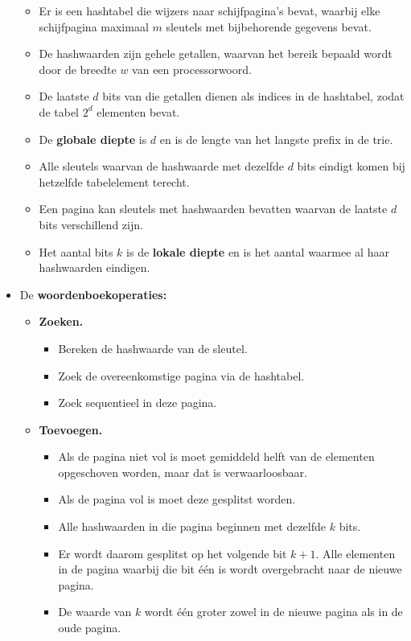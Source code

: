 \begin{itemize}
\begin{itemize}
        \item Er is een hashtabel die wijzers naar schijfpagina's bevat, waarbij elke schijfpagina maximaal $m$ sleutels met bijbehorende gegevens bevat.
        \item De hashwaarden zijn gehele getallen, waarvan het bereik bepaald wordt door de breedte $w$ van een processorwoord.
        \item De laatste $d$ bits van die getallen dienen als indices in de hashtabel, zodat de tabel $2^d$ elementen bevat.
        \item De \textbf{globale diepte} is $d$ en is de lengte van het langste prefix in de trie.
        \item Alle sleutels waarvan de hashwaarde met dezelfde $d$ bits eindigt komen bij hetzelfde tabelelement terecht.
        \item Een pagina kan sleutels met hashwaarden bevatten waarvan de laatste $d$ bits verschillend zijn.
        \item Het aantal bits $k$ is de \textbf{lokale diepte} en is het aantal waarmee al haar hashwaarden eindigen.
    \end{itemize}
    \item De \textbf{woordenboekoperaties:}
    \begin{itemize}
        \item \textbf{Zoeken.}
        \begin{itemize}
            \item Bereken de hashwaarde van de sleutel.
            \item Zoek de overeenkomstige pagina via de hashtabel.
            \item Zoek sequentieel in deze pagina.
        \end{itemize}
        \item \textbf{Toevoegen.}
        \begin{itemize}
            \item Als de pagina niet vol is moet gemiddeld helft van de elementen opgeschoven worden, maar dat is verwaarloosbaar.
            \item Als de pagina vol is moet deze gesplitst worden.
            \item Alle hashwaarden in die pagina beginnen met dezelfde $k$ bits.
            \item Er wordt daarom gesplitst op het volgende bit $k + 1$. Alle elementen in de pagina waarbij die bit één is wordt overgebracht naar de nieuwe pagina.
            \item De waarde van $k$ wordt één groter zowel in de nieuwe pagina als in de oude pagina.

\end{itemize}
\end{itemize}
\end{itemize}

